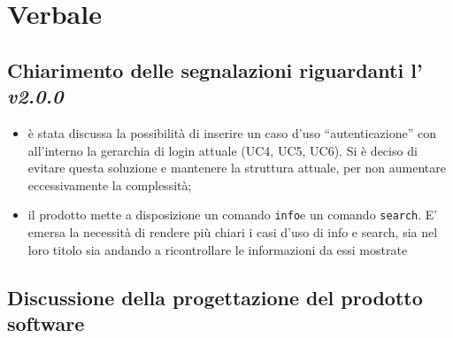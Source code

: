 \section{Verbale}
\subsection{Chiarimento delle segnalazioni riguardanti l'\AdR{} \textit{v2.0.0}}
	\begin{itemize}
		\item è stata discussa la possibilità di inserire un caso d’uso “autenticazione” con all’interno la gerarchia di login attuale (UC4, UC5, UC6). Si è deciso di evitare questa soluzione e mantenere la struttura attuale, per non aumentare eccessivamente la complessità;

		\item il prodotto mette a disposizione un comando \texttt{info}e un comando \texttt{search}. E' emersa la necessità di rendere più chiari i casi d’uso di info e search, sia nel loro titolo sia andando a ricontrollare le informazioni da essi mostrate
	\end{itemize}

\subsection{Discussione della progettazione del prodotto software}
